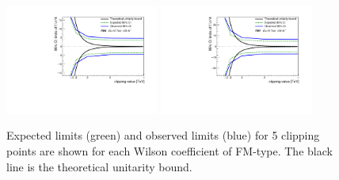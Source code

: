\begin{figure}[ht]
   \includegraphics[width=0.45\textwidth]{figures/aQGC/FM5limit.pdf}
   \includegraphics[width=0.45\textwidth]{figures/aQGC/FM7limit.pdf}
   \caption{Expected limits (green) and observed limits (blue) for 5 clipping points are shown for each Wilson coefficient of FM-type. 
   The black line is the theoretical unitarity bound.}
        \label{fig:aQGClimitsFMs}
\end{figure}

